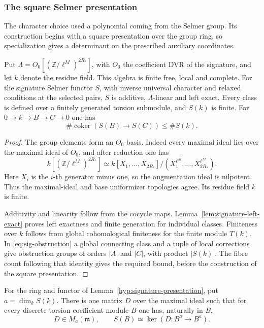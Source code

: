 \subsubsection*{The square Selmer presentation}

The character choice used a polynomial coming from the Selmer group. Its construction begins with a square presentation over the group ring, so specialization gives a determinant on the prescribed auxiliary coordinates.

\begin{established}\label{hyp:signature-presentation}
Put \(\Lambda=O_0[(\mathbb Z/\ell^M)^{2R_*}]\), with \(O_0\) the coefficient DVR of the signature, and let \(k\) denote the residue field. This algebra is finite free, local and complete. For the signature Selmer functor \(S\), with inverse universal character and relaxed conditions at the selected pairs, \(S\) is additive, \(\Lambda\)-linear and left exact. Every class is defined over a finitely generated torsion submodule, and \(S(k)\) is finite. For \(0\to k\to B\to C\to0\) one has
\[
 \#\operatorname{coker}(S(B)\longrightarrow S(C))\le\# S(k).
\]
\end{established}
\begin{proof}
The group elements form an \(O_0\)-basis. Indeed every maximal ideal lies
over the maximal ideal of \(O_0\), and after reduction one has
\[
 k[(\mathbb Z/\ell^M)^{2R_*}]\simeq k[X_1,\ldots,X_{2R_*}]/(X_1^{\ell^M},\ldots,X_{2R_*}^{\ell^M}).
\]
Here \(X_i\) is the \(i\)-th generator minus one, so the augmentation ideal is nilpotent.
Thus the maximal-ideal and base uniformizer topologies agree.
Its residue field \(k\) is finite.

 Additivity and linearity follow from the cocycle maps. Lemma~\ref{lem:signature-left-exact} proves left exactness and finite generation for individual classes. Finiteness over \(k\) follows from global cohomological finiteness for the finite module \(T(k)\). In \eqref{eq:sig-obstruction} a global connecting class and a tuple of local corrections give obstruction groups of orders \(|A|\) and \(|C|\), with product \(|S(k)|\). The fibre count following that identity gives the required bound, before the construction of the square presentation.
\end{proof}

\begin{lemma}
\label{lem:signature-square-presentation}
For the ring and functor of Lemma~\ref{hyp:signature-presentation}, put
\(a=\dim_k S(k)\). There is one matrix \(D\) over the maximal ideal such that for every discrete torsion coefficient module \(B\) one has, naturally in \(B\),
\[
 D\in M_a(\mathfrak m),\qquad S(B)\simeq\ker(D:B^a\longrightarrow B^a).
\]
\end{lemma}

